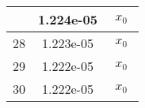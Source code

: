 \begin{center}
\begin{tabular}{|c|c|c|}
& 1.224e-05 & $\begin{aligned}x_{0}\end{aligned}$\\ \hline28 & 1.223e-05 & $\begin{aligned}x_{0}\end{aligned}$\\ \hline29 & 1.222e-05 & $\begin{aligned}x_{0}\end{aligned}$\\ \hline30 & 1.222e-05 & $\begin{aligned}x_{0}\end{aligned}$\\ \hline\end{tabular}
        \end{center}
        